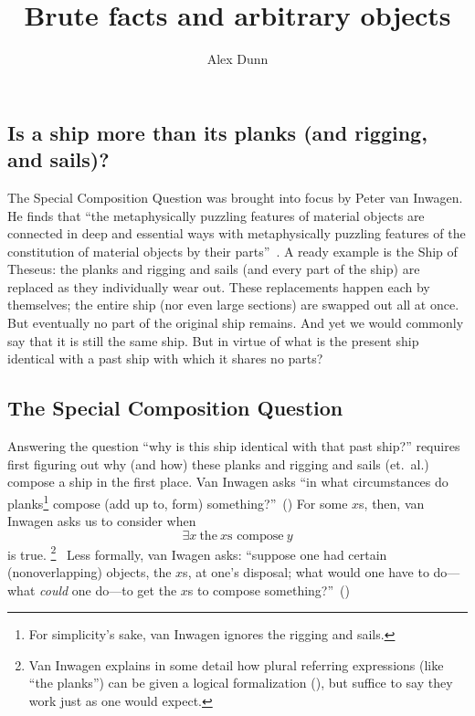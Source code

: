 \documentclass[11pt]{article}
\title{Brute facts and arbitrary objects}
\author{Alex Dunn}
\begin{document}
\ifstandalone
\maketitle
\begin{spacing}{1.5}
\fi



\section{Is a ship more than its planks (and rigging, and sails)?}
The Special Composition Question was brought into focus by Peter van Inwagen. He finds that ``the metaphysically puzzling features of material objects are connected in deep and essential ways with metaphysically puzzling features of the constitution of material objects by their parts''~\citep[18]{inwagen1995}. A ready example is the Ship of Theseus: the planks and rigging and sails (and every part of the ship) are replaced as they individually wear out. These replacements happen each by themselves; the entire ship (nor even large sections) are swapped out all at once. But eventually no part of the original ship remains. And yet we would commonly say that it is still the same ship. But in virtue of what is the present ship identical with a past ship with which it shares no parts?

\subsection{The Special Composition Question}
Answering the question ``why is this ship identical with that past ship?'' requires first figuring out why (and how) these planks and rigging and sails (et.\ al.) compose a ship in the first place. Van Inwagen asks ``in what circumstances do planks\footnote{For simplicity's sake, van Inwagen ignores the rigging and sails.} compose (add up to, form) something?''~(\citeyear[21]{inwagen1995}) For some $x$s, then, van Inwagen asks us to consider when
\begin{equation}
\exists x\ \text{the}\ x\text{s compose}\ y
\end{equation}
is true.%
\footnote{Van Inwagen explains in some detail how plural referring expressions (like ``the planks'') can be given a logical formalization (\citeyear[23--28]{inwagen1995}), but suffice to say they work just as one would expect.}%
%
\ Less formally, van Iwagen asks: ``suppose one had certain (nonoverlapping) objects, the $x$s, at one's disposal; what would one have to do---what {\em could} one do---to get the $x$s to compose something?''~(\citeyear[31]{inwagen1995})


\end{spacing}
\end{document}

